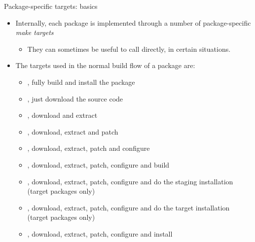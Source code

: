 \begin{frame}{Package-specific targets: basics}
  \begin{itemize}
  \item Internally, each package is implemented through a number of
    package-specific {\em make targets}
    \begin{itemize}
    \item They can sometimes be useful to call directly, in certain
      situations.
    \end{itemize}
  \item The targets used in the normal build flow of a package are:
    \begin{itemize}
    \item {}, fully build and install the package
    \item {}, just download the source code
    \item {}, download and extract
    \item {}, download, extract and patch
    \item {}, download, extract, patch and configure
    \item {}, download, extract, patch, configure and build
    \item {}, download, extract, patch,
      configure and do the staging installation (target packages only)
    \item {}, download, extract, patch,
      configure and do the target installation (target packages only)
    \item {}, download, extract, patch,
      configure and install
    \end{itemize}
  \end{itemize}
\end{frame}

